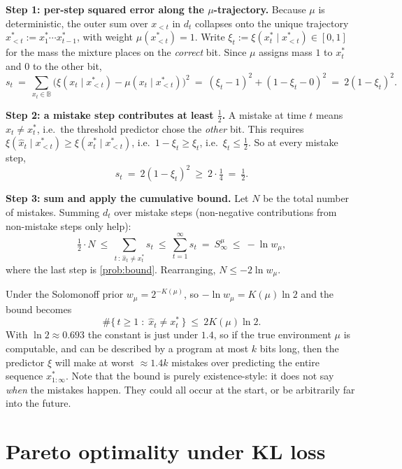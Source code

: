 \documentclass[fontsize=11pt, parskip=half]{scrartcl}
\begin{document}
\begin{solution}
\textbf{Step 1: per-step squared error along the $\mu$-trajectory.}
Because $\mu$ is deterministic, the outer sum over $x_{<t}$ in $d_t$ collapses
onto the unique trajectory $x_{<t}^* := x_1^* \cdots x_{t-1}^*$, with weight
$\mu(x_{<t}^*) = 1$. Write $\xi_t := \xi(x_t^* \mid x_{<t}^*) \in [0,1]$ for the
mass the mixture places on the \emph{correct} bit. Since $\mu$ assigns mass $1$
to $x_t^*$ and $0$ to the other bit,
\[
  s_t ~=~ \sum_{x_t \in \mathbb{B}} \big(\xi(x_t \mid x_{<t}^*) - \mu(x_t \mid x_{<t}^*)\big)^2
  ~=~ (\xi_t - 1)^2 + (1 - \xi_t - 0)^2 ~=~ 2(1 - \xi_t)^2.
\]

\textbf{Step 2: a mistake step contributes at least $\tfrac12$.}
A mistake at time $t$ means $\hat{x}_t \neq x_t^*$, i.e.\ the threshold predictor
chose the \emph{other} bit. This requires
$\xi(\hat{x}_t \mid x_{<t}^*) \geq \xi(x_t^* \mid x_{<t}^*)$, i.e.\
$1 - \xi_t \geq \xi_t$, i.e.\ $\xi_t \leq \tfrac12$. So at every mistake step,
\[
  s_t ~=~ 2(1 - \xi_t)^2 ~\geq~ 2 \cdot \tfrac{1}{4} ~=~ \tfrac12.
\]

\textbf{Step 3: sum and apply the cumulative bound.}
Let $N$ be the total number of mistakes. Summing $d_t$ over mistake steps
(non-negative contributions from non-mistake steps only help):
\[
  \tfrac12 \cdot N
  ~\leq~ \sum_{t \,:\, \hat{x}_t \neq x_t^*} s_t
  ~\leq~ \sum_{t=1}^\infty s_t ~=~ S^\mu_\infty
  ~\leq~ -\ln w_\mu,
\]
where the last step is \cref{prob:bound}. Rearranging, $N \leq -2 \ln w_\mu$.
\qedhere
\end{solution}

\begin{remark}
Under the Solomonoff prior $w_\mu = 2^{-K(\mu)}$, so $-\ln w_\mu = K(\mu)\ln 2$
and the bound becomes
\[
  \#\{\, t \geq 1 \;:\; \hat{x}_t \neq x_t^* \,\} ~\leq~ 2 K(\mu) \ln 2.
\]
With $\ln 2 \approx 0.693$ the constant is just under $1.4$, so if the true 
environment $\mu$ is computable, and can be described by a program at most $k$ bits long, 
then the predictor $\xi$ 
will make at worst $\approx 1.4 k$ mistakes over predicting the entire sequence $x^*_{1:\infty}$.
Note that the bound is purely existence-style: it does not say \emph{when}
the mistakes happen. They could all occur at the start, or be arbitrarily far into the future.
\end{remark}

\section{Pareto optimality under KL loss}\label{prob:kl}
\end{document}
